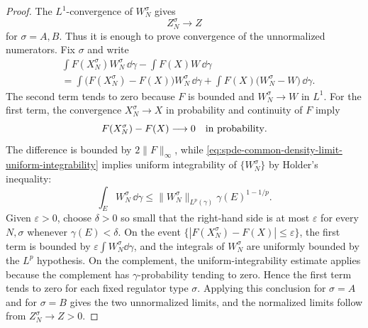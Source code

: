 \begin{proof}
The \(L^1\)-convergence of \(W_N^\sigma\) gives
\[
  Z_N^\sigma\longrightarrow Z
\]
for \(\sigma=A,B\).  Thus it is enough to prove convergence of the
unnormalized numerators.  Fix \(\sigma\) and write
\[
\begin{aligned}
  &\int F(X_N^\sigma)W_N^\sigma\,\dd\gamma
  -
  \int F(X)W\,\dd\gamma
\\
  &=
  \int \bigl(F(X_N^\sigma)-F(X)\bigr)W_N^\sigma\,\dd\gamma
  +
  \int F(X)\bigl(W_N^\sigma-W\bigr)\,\dd\gamma .
\end{aligned}
\]
The second term tends to zero because \(F\) is bounded and
\(W_N^\sigma\to W\) in \(L^1\).  For the first term, the convergence
\(X_N^\sigma\to X\) in probability and continuity of \(F\) imply
\[
  F(X_N^\sigma)-F(X)\longrightarrow0
  \quad\hbox{in probability}.
\]
The difference is bounded by \(2\|F\|_\infty\), while
\eqref{eq:spde-common-density-limit-uniform-integrability} implies uniform
integrability of \(\{W_N^\sigma\}\) by Holder's inequality:
\[
  \int_E W_N^\sigma\,\dd\gamma
  \leq
  \|W_N^\sigma\|_{L^p(\gamma)}
  \gamma(E)^{1-1/p}.
\]
Given \(\varepsilon>0\), choose \(\delta>0\) so small that the right-hand
side is at most \(\varepsilon\) for every \(N,\sigma\) whenever
\(\gamma(E)<\delta\).  On the event
\(\{|F(X_N^\sigma)-F(X)|\leq\varepsilon\}\), the first term is bounded by
\(\varepsilon\int W_N^\sigma\dd\gamma\), and the integrals of
\(W_N^\sigma\) are uniformly bounded by the \(L^p\) hypothesis.  On the
complement, the uniform-integrability estimate applies because the
complement has \(\gamma\)-probability tending to zero.  Hence the first term
tends to zero for each fixed regulator type \(\sigma\).  Applying this
conclusion for \(\sigma=A\) and for \(\sigma=B\) gives the two unnormalized
limits, and the normalized limits follow from \(Z_N^\sigma\to Z>0\).
\end{proof}

